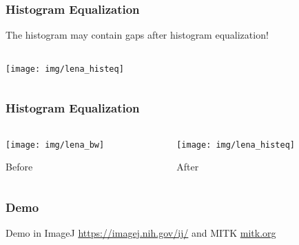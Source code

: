 \begin{frame}
    \frametitle{Histogram Equalization}
    The histogram may contain gaps after histogram equalization!
    \bigskip

    \begin{columns}[c, onlytextwidth]
        \begin{column}{0.5\textwidth}\centering
            \texttt{[image: img/lena\_histeq]}
        \end{column}%
        \begin{column}{0.5\textwidth}\centering
        \end{column}
    \end{columns}
\end{frame}


\begin{frame}
    \frametitle{Histogram Equalization}
    \begin{columns}[T, onlytextwidth]
        \begin{column}{0.5\textwidth}\centering
            \texttt{[image: img/lena\_bw]}

            Before
        \end{column}
        \begin{column}{0.5\textwidth}\centering
            \texttt{[image: img/lena\_histeq]}

            After
        \end{column}
    \end{columns}
\end{frame}


\begin{frame}
    \frametitle{Demo}
    Demo in ImageJ \url{https://imagej.nih.gov/ij/} and MITK \url{mitk.org}
    \bigskip
\end{frame}


